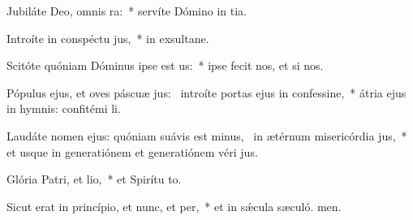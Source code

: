 \item Jubiláte Deo, omnis ra:~* servíte Dómino in tia.
\item Introíte in conspéctu jus,~* in exsultane.
\item Scitóte quóniam Dóminus ipse est us:~* ipse fecit nos, et  si nos.
\item Pópulus ejus, et oves páscuæ jus:~\pscross{} introíte portas ejus in confessine,~* átria ejus in hymnis: confitémi li.
\item Laudáte nomen ejus: quóniam suávis est minus,~\pscross{} in ætérnum misericórdia jus,~* et usque in generatiónem et generatiónem véri jus.
\item Glória Patri, et lio,~* et Spirítu to.
\item Sicut erat in princípio, et nunc, et per,~* et in sǽcula sæculó. men.
